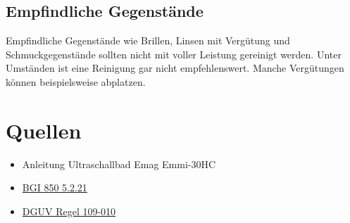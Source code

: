 \documentclass{\basedir/fablab-document}
\begin{document}
\subsection{Empfindliche Gegenstände}
Empfindliche Gegenstände wie Brillen, Linsen mit Vergütung und Schmuckgegenstände sollten nicht mit voller Leistung gereinigt werden.
Unter Umständen ist eine Reinigung gar nicht empfehlenswert.
Manche Vergütungen können beispielsweise abplatzen.

 \section{Quellen}
  \begin{itemize}
   \item Anleitung Ultraschallbad Emag Emmi-30HC
   \item \href{http://bgi850-0.vur.jedermann.de/index.jsp?isbn=bgi850-0&alias=bgc_bi850_0_bi850_0_s5_2_21_}{BGI 850 5.2.21}
   \item \href{http://www.arbeitssicherheit.de/de/html/library/document/4989034,37}{DGUV Regel 109-010}
  \end{itemize}


\end{document}
